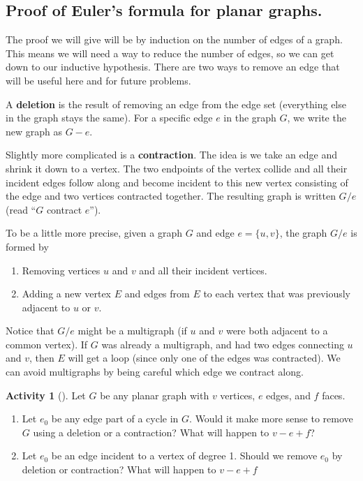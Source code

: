 \documentclass[10pt,]{book}
\newcommand{\terminology}[1]{\textbf{#1}}
\theoremstyle{plain}
\theoremstyle{definition}
\theoremstyle{definition}
\theoremstyle{definition}
\newtheorem{activity}[project]{Activity}
\numberwithin{equation}{chapter}
\begin{document}
\subsection[{Proof of Euler's formula for planar graphs.}]{Proof of Euler's formula for planar graphs.}\label{subsection-6}
\hypertarget{p-248}{}%
The proof we will give will be by induction on the number of edges of a graph.  This means we will need a way to reduce the number of edges, so we can get down to our inductive hypothesis.  There are two ways to remove an edge that will be useful here and for future problems.%
\par
\hypertarget{p-249}{}%
 A \terminology{deletion} is the result of removing an edge from the edge set (everything else in the graph stays the same).  For a specific edge \(e\) in the graph \(G\), we write the new graph as \(G - e\).%
\par
\hypertarget{p-250}{}%
 Slightly more complicated is a \terminology{contraction}.  The idea is we take an edge and shrink it down to a vertex.  The two endpoints of the vertex collide and all their incident edges follow along and become incident to this new vertex consisting of the edge and two vertices contracted together.  The resulting graph is written \(G/e\) (read ``\(G\) contract \(e\)'').%
\par
\hypertarget{p-251}{}%
To be a little more precise, given a graph \(G\) and edge \(e = \{u,v\}\), the graph \(G/e\) is formed by \leavevmode%
\begin{enumerate}
\item\hypertarget{li-29}{}\hypertarget{p-252}{}%
Removing vertices \(u\) and \(v\) and all their incident vertices.%
\item\hypertarget{li-30}{}\hypertarget{p-253}{}%
Adding a new vertex \(E\) and edges from \(E\) to each vertex that was previously adjacent to \(u\) or \(v\).%
\end{enumerate}
 Notice that \(G/e\) might be a multigraph (if \(u\) and \(v\) were both adjacent to a common vertex).  If \(G\) was already a multigraph, and had two edges connecting \(u\) and \(v\), then \(E\) will get a loop (since only one of the edges was contracted).  We can avoid multigraphs by being careful which edge we contract along.%
\begin{activity}[]\label{activity-19}
\hypertarget{p-254}{}%
Let \(G\) be any planar graph with \(v\) vertices, \(e\) edges, and \(f\) faces.%
\begin{enumerate}[font=\bfseries,label=(\alph*),ref=\alph*]
\item\label{task-29} \hypertarget{p-255}{}%
Let \(e_0\) be any edge part of a cycle in \(G\).  Would it make more sense to remove \(G\) using a deletion or a contraction?  What will happen to \(v - e + f\)?%
\item\label{task-30} \hypertarget{p-256}{}%
Let \(e_0\) be an edge incident to a vertex of degree 1.  Should we remove \(e_0\) by deletion or contraction?  What will happen to \(v- e + f\)%
\end{enumerate}
\end{activity}
\end{document}

